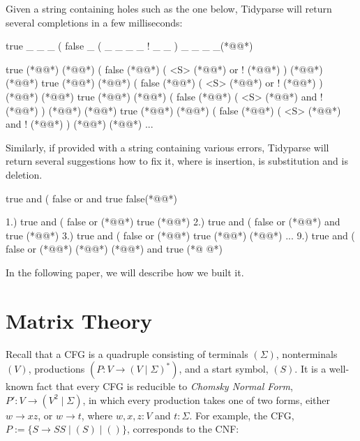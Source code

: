 \documentclass[sigplan,review,anonymous,acmsmall]{acmart}\settopmatter{printfolios=false,printccs=false,printacmref=false}
\begin{document}
    \noindent Given a string containing holes such as the one below, Tidyparse will return several completions in a few milliseconds:

\begin{tidyinput}
true _ _ _ ( false _ ( _ _ _ _ ! _ _ ) _ _ _ _(*@\caret{ }@*)
\end{tidyinput}

\begin{tidyoutput}
true (*@@*) (*@\hlorange{!}@*) ( false (*@@*) ( <S> (*@\hlorange{)}@*) or ! (*@@*) ) (*@@*) (*@@*)
true (*@@*) (*@\hlorange{!}@*) ( false (*@@*) ( <S> (*@\hlorange{)}@*) or ! (*@@*) ) (*@@*) (*@@*)
true (*@@*) (*@\hlorange{!}@*) ( false (*@@*) ( <S> (*@\hlorange{)}@*) and ! (*@@*) ) (*@@*) (*@@*)
true (*@@*) (*@\hlorange{!}@*) ( false (*@@*) ( <S> (*@\hlorange{)}@*) and ! (*@@*) ) (*@@*) (*@@*)
...
\end{tidyoutput}

    \noindent Similarly, if provided with a string containing various errors, Tidyparse will return several suggestions how to fix it, where  is insertion,  is substitution and  is deletion.

\begin{tidyinput}
true and ( false or and true false(*@\caret{ }@*)
\end{tidyinput}

\begin{tidyoutput}
1.) true and ( false or (*@\hlorange{!}@*) true (*@\hlorange{)}@*)
2.) true and ( false or (*@@*) and true (*@\hlorange{)}@*)
3.) true and ( false or (*@\hlorange{(}@*) true (*@\hlorange{)}@*) (*@\hlgreen{)}@*)
...
9.) true and ( false or (*@\hlgreen{!}@*) (*@@*) (*@\hlgreen{)}@*) and true (*@ @*)
\end{tidyoutput}

    \noindent In the following paper, we will describe how we built it.

  \section{Matrix Theory}

  Recall that a CFG is a quadruple consisting of terminals $(\Sigma)$, nonterminals $(V)$, productions $(P\colon V \rightarrow (V \mid \Sigma)^*)$, and a start symbol, $(S)$. It is a well-known fact that every CFG is reducible to \textit{Chomsky Normal Form}, $P'\colon V \rightarrow (V^2 \mid \Sigma)$, in which every production takes one of two forms, either $w \rightarrow xz$, or $w \rightarrow t$, where $w, x, z: V$ and $t: \Sigma$. For example, the CFG, $P:=\{S \rightarrow S S \mid ( S ) \mid ()\}$, corresponds to the CNF:\vspace{-3pt}
\end{document}
